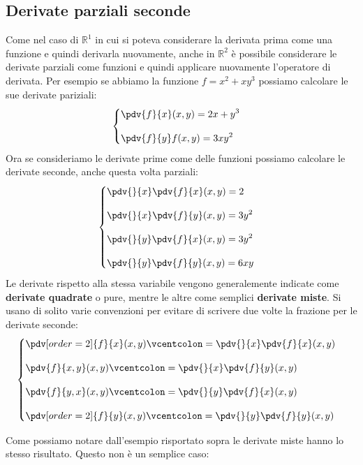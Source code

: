 \subsection{Derivate parziali seconde}
Come nel caso di $\mathbb{R}^1$ in cui si poteva considerare la derivata prima come una funzione e quindi derivarla nuovamente, anche in $\mathbb{R}^2$ è possibile considerare le derivate parziali come funzioni e quindi applicare nuovamente l'operatore di derivata. Per esempio se abbiamo la funzione $f = x^2 + xy^3$ possiamo calcolare le sue derivate pariziali:
\begin{equation*}
	\begin{cases}
		\displaystyle \pdv{f}{x} (x, y) = 2x + y^3\\[10pt]
		\displaystyle \pdv{f}{y} f(x, y) = 3xy^2
	\end{cases}
\end{equation*}
Ora se consideriamo le derivate prime come delle funzioni possiamo calcolare le derivate seconde, anche questa volta parziali:
\begin{equation*}
	\begin{cases}
		\displaystyle \pdv{}{x} \pdv{f}{x}(x, y) = 2\\[10pt]
		\displaystyle \pdv{}{x} \pdv{f}{y}(x, y) = 3y^2\\[10pt]
		\displaystyle \pdv{}{y} \pdv{f}{x}(x, y) = 3y^2\\[10pt]
		\displaystyle \pdv{}{y} \pdv{f}{y}(x, y) = 6xy
	\end{cases}
\end{equation*}
Le derivate rispetto alla stessa variabile vengono generalemente indicate come \textbf{derivate quadrate} o pure, mentre le altre come semplici \textbf{derivate miste}. Si usano di solito varie convenzioni per evitare di scrivere due volte la frazione per le derivate seconde: 
\begin{equation*}
	\begin{cases}
		\displaystyle \pdv[order=2]{f}{x}(x, y) \vcentcolon = \displaystyle \pdv{}{x} \pdv{f}{x}(x, y) \\[10pt]
		\displaystyle \pdv{f}{x,y}(x, y) \vcentcolon = \displaystyle \pdv{}{x} \pdv{f}{y}(x, y) \\[10pt]
		\displaystyle \pdv{f}{y,x}(x, y) \vcentcolon = \displaystyle \pdv{}{y} \pdv{f}{x}(x, y) \\[10pt]
		\displaystyle \pdv[order=2]{f}{y}(x, y) \vcentcolon = \displaystyle \pdv{}{y} \pdv{f}{y}(x, y) 
	\end{cases}
\end{equation*}

Come possiamo notare dall'esempio risportato sopra le derivate miste hanno lo stesso risultato. Questo non è un semplice caso:
